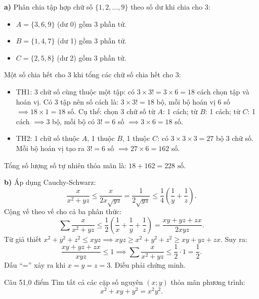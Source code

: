 \begin{loi_giai_cau}
\textbf{a)} Phân chia tập hợp chữ số $\{1, 2, \dots, 9\}$ theo số dư khi chia cho 3:
\begin{itemize}
\item $A = \{3, 6, 9\}$ (dư 0) gồm 3 phần tử.
\item $B = \{1, 4, 7\}$ (dư 1) gồm 3 phần tử.
\item $C = \{2, 5, 8\}$ (dư 2) gồm 3 phần tử.
\end{itemize}
Một số chia hết cho 3 khi tổng các chữ số chia hết cho 3:
\begin{itemize}
\item TH1: 3 chữ số cùng thuộc một tập: có $3 \times 3! = 3 \times 6 = 18$ cách chọn tập và hoán vị. Có $3$ tập nên số cách là: $3 \times 3! = 18$ bộ, mỗi bộ hoán vị 6 số $\implies 18 \times 1 = 18$ số. Cụ thể: chọn 3 chữ số từ $A$: 1 cách; từ $B$: 1 cách; từ $C$: 1 cách $\implies 3$ bộ, mỗi bộ có $3! = 6$ số $\implies 3 \times 6 = 18$ số.
\item TH2: 1 chữ số thuộc $A$, 1 thuộc $B$, 1 thuộc $C$: có $3 \times 3 \times 3 = 27$ bộ 3 chữ số. Mỗi bộ hoán vị tạo ra $3! = 6$ số $\implies 27 \times 6 = 162$ số.
\end{itemize}
Tổng số lượng số tự nhiên thỏa mãn là: $18 + 162 = \boxed{228\text{ số}}$.

\textbf{b)} Áp dụng Cauchy-Schwarz:
\[\frac{x}{x^2+yz} \le \frac{x}{2x\sqrt{yz}} = \frac{1}{2\sqrt{yz}} \le \frac{1}{4}\left(\frac{1}{y} + \frac{1}{z}\right).\]
Cộng vế theo vế cho cả ba phân thức:
\[\sum \frac{x}{x^2+yz} \le \frac{1}{2}\left(\frac{1}{x} + \frac{1}{y} + \frac{1}{z}\right) = \frac{xy+yz+zx}{2xyz}.\]
Từ giả thiết $x^2+y^2+z^2 \le xyz \implies xyz \ge x^2+y^2+z^2 \ge xy+yz+zx$.
Suy ra:
\[\frac{xy+yz+zx}{xyz} \le 1 \implies \sum \frac{x}{x^2+yz} \le \frac{1}{2} \cdot 1 = \boxed{\frac{1}{2}}.\]
Dấu ``='' xảy ra khi $x = y = z = 3$. Điều phải chứng minh.
\end{loi_giai_cau}

\begin{de_cau}{Câu 5}{1,0 điểm}
Tìm tất cả các cặp số nguyên $(x; y)$ thỏa mãn phương trình:
\[x^2 + xy + y^2 = x^2 y^2.\]
\end{de_cau}

